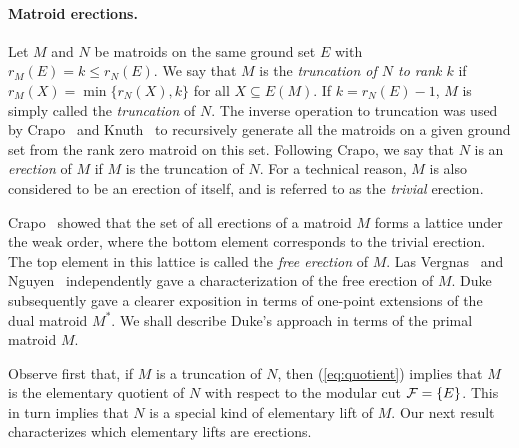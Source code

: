 \documentclass{daj}
\begin{document}
\paragraph{Matroid erections.}
Let $M$ and $N$ be matroids on the same ground set $E$ with $r_M(E)=k\leq r_N(E)$.
We say that $M$ is the
{\em truncation of $N$ to rank $k$} if $r_M(X)=\min\{r_N(X), k\}$ for all $X\subseteq E(M)$.
If $k=r_N(E)-1$, $M$ is simply called the {\em truncation} of $N$.
The inverse operation to truncation was used by Crapo~\cite{C70} and Knuth~\cite{K75} to recursively generate all the matroids on a given ground set  from the rank zero matroid on this set. Following Crapo, we say that $N$ is an {\em erection} of $M$ if $M$ is the truncation of $N$.
For a technical reason, $M$ is also considered to be  an erection of itself,  and is referred to as   the {\em trivial} erection.

Crapo~\cite{C70} showed that the set of all erections of a matroid $M$ forms a lattice under the weak order,
where the bottom element corresponds to the trivial erection.
The top element in this lattice is called the {\em free erection} of $M$.
Las Vergnas~\cite{L76} and Nguyen~\cite{N79} independently gave a characterization of the free erection of $M$.  Duke~\cite{D87} subsequently gave a clearer exposition in terms of one-point extensions of the dual matroid $M^*$.
We shall describe Duke's approach in terms of the primal matroid $M$.

Observe first that, if $M$ is a truncation of $N$, then (\ref{eq:quotient}) implies that $M$ is the elementary quotient of $N$ with respect to the modular cut ${\cal  F}=\{E\}$. This in turn implies that $N$ is  a special kind of elementary lift of $M$. Our next result characterizes which elementary lifts are erections.
\end{document}
